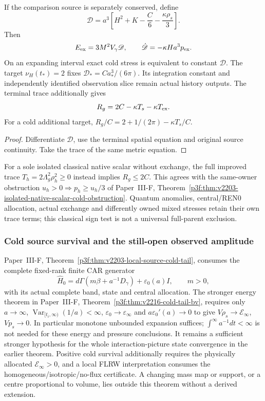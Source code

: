 \documentclass[12pt,a4paper]{article}
\begin{document}
\begin{corollary}
\label{p8:cor:v2203-terminal-cold-charge-trace}
If the comparison source is separately conserved, define
\[
 \mathscr D=a^3
 \left[H^2+K-\frac C6-\frac{\kappa\rho_s}{3}\right].
\]
Then
\[
 E_{\rm ex}=3M^2V_\gamma\mathscr D,\qquad
 \dot{\mathscr D}=-\kappa Ha^3p_{\rm ex}.
\]
On an expanding interval exact cold stress is equivalent to constant
$\mathscr D$. The target $\nu_H(t_*)=2$ fixes
$\mathscr D_*=Ca_*^3/(6\pi)$. Its integration constant and independently
identified observation slice remain actual history outputs.
The terminal trace additionally gives
\begin{equation}
\label{p8:eq:v2203-terminal-Ricci-test}
 R_g=2C-\kappa T_s-\kappa T_{\rm ex}.
\end{equation}
For a cold additional target,
$R_g/C=2+1/(2\pi)-\kappa T_s/C$.
\end{corollary}
\begin{proof}
Differentiate $\mathscr D$, use the terminal spatial equation and
original source continuity. Take the trace of the same metric equation.
\end{proof}
For a sole isolated classical native scalar without exchange, the full
improved trace $T_h=2\Lambda_g^2\rho_h^2\ge0$ instead implies $R_g\le2C$.
This agrees with the same-owner obstruction $u_h>0\Rightarrow p_h\ge u_h/3$
of Paper~III-F,
Theorem~\ref{p3f:thm:v2203-isolated-native-scalar-cold-obstruction}.
Quantum anomalies, central/REN0 allocation, actual exchange and differently
owned mixed stresses retain their own trace terms; this classical sign
test is not a universal full-parent exclusion.

\subsubsection{Cold source survival and the still-open observed amplitude}
Paper~III-F, Theorem~\ref{p3f:thm:v2203-local-source-cold-tail},
consumes the complete fixed-rank finite CAR generator
\[
 \widehat H_0=d\Gamma(m\beta+a^{-1}D_\gamma)+\varepsilon_0(a)I,
 \qquad m>0,
\]
with its actual complete band, state and central allocation.
The stronger energy theorem in Paper~III-F,
Theorem~\ref{p3f:thm:v2216-cold-tail-bv}, requires only
$a\to\infty$, $\operatorname{Var}_{[t_i,\infty)}(1/a)<\infty$,
$\varepsilon_0\to\varepsilon_\infty$ and
$a\varepsilon_0'(a)\to0$ to give $V\rho_s\to\mathcal E_\infty$,
$Vp_s\to0$.  In particular monotone unbounded expansion suffices;
$\int^\infty a^{-1}dt<\infty$ is not needed for these energy and
pressure conclusions.  It remains a sufficient stronger hypothesis for
the whole interaction-picture state convergence in the earlier theorem.
Positive cold survival additionally requires the physically
allocated $\mathcal E_\infty>0$, and a local FLRW interpretation consumes
the homogeneous/isotropic/no-flux certificate. A changing mass map or
support, or a centre proportional to volume, lies outside this theorem
without a derived extension.
\end{document}
